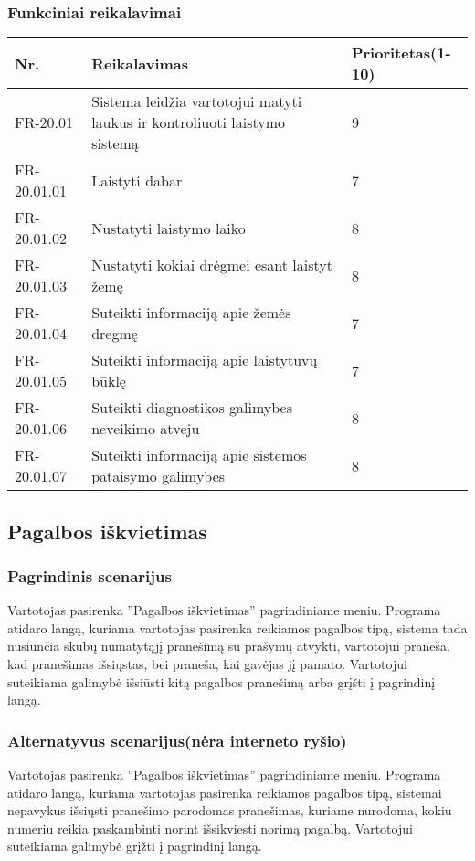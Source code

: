 \documentclass[oneside]{VUMIFPSkursinis}
\begin{document}
	\subsubsection{Funkciniai reikalavimai}
\begin{table}[htbp]
	\begin{tabularx}{1\textwidth}{ |P{2.5cm}|X|P{3cm }| } \hline
		Nr. & Reikalavimas & Prioritetas(1-10) \\ \hline
		FR-20.01 & Sistema leidžia vartotojui matyti laukus ir kontroliuoti laistymo sistemą & 9 \\ \hline
		FR-20.01.01 & Laistyti dabar & 7 \\ \hline
		FR-20.01.02 & Nustatyti laistymo laiko & 8\\ \hline
		FR-20.01.03 & Nustatyti kokiai drėgmei esant laistyt žemę & 8 \\ \hline
		FR-20.01.04 & Suteikti informaciją apie žemės dregmę & 7 \\ \hline
		FR-20.01.05 & Suteikti informaciją apie laistytuvų būklę & 7 \\ \hline
		FR-20.01.06 & Suteikti diagnostikos galimybes neveikimo atveju & 8 \\ \hline
		FR-20.01.07 & Suteikti informaciją apie sistemos pataisymo galimybes & 8 \\ \hline
	\end{tabularx}
\end{table}
\subsection{Pagalbos iškvietimas}
	\subsubsection{Pagrindinis scenarijus}
	Vartotojas pasirenka ''Pagalbos iškvietimas'' pagrindiniame meniu. Programa atidaro langą, kuriama vartotojas pasirenka reikiamos pagalbos tipą, sistema tada nusiunčia skubų numatytąjį pranešimą su prašymų atvykti, vartotojui praneša, kad pranešimas išsiųstas, bei praneša, kai gavėjas jį pamato. Vartotojui suteikiama galimybė išsiūsti kitą pagalbos pranešimą arba grįšti į pagrindinį langą.
	\subsubsection{Alternatyvus scenarijus(nėra interneto ryšio)}
	Vartotojas pasirenka ''Pagalbos iškvietimas'' pagrindiniame meniu. Programa atidaro langą, kuriama vartotojas pasirenka reikiamos pagalbos tipą, sistemai nepavykus išsiųsti pranešimo parodomas pranešimas, kuriame nurodoma, kokiu numeriu reikia paskambinti norint išsikviesti norimą pagalbą. Vartotojui suteikiama galimybė grįžti į pagrindinį langą.
\end{document}
